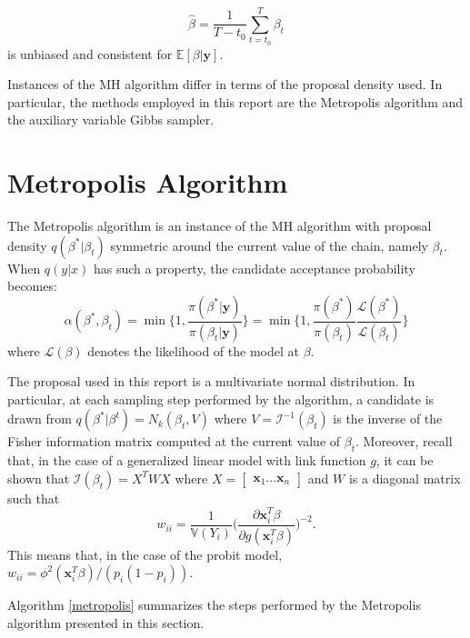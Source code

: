 \documentclass{article}
\newcommand{\EX}[0]{\mathbb{E}} %
\newcommand{\V}[0]{\mathbb{V}}
\renewcommand{\vec}[1]{\mathbf{#1}}
\begin{document}
\begin{equation*}
    \hat{\beta} = \frac{1}{T-t_0} \sum_{t=t_0}^T \beta_t
\end{equation*}
is unbiased and consistent for \(\EX[\beta|\vec{y}]\).
\par
Instances of the MH algorithm differ in terms of the proposal density used. In particular, the methods employed in this report are the Metropolis algorithm and the auxiliary variable Gibbs sampler.

\section{Metropolis Algorithm}
The Metropolis algorithm is an instance of the MH algorithm with proposal density \(q(\beta^*|\beta_t)\) symmetric around the current value of the chain, namely \(\beta_t\). When \(q(y|x)\) has such a property, the candidate acceptance probability becomes:
\begin{equation*}
    \alpha(\beta^*, \beta_t) = \min\Bigg\{1, \frac{\pi(\beta^*|\vec{y})}{\pi(\beta_t|\vec{y})}\Bigg\} = \min\Bigg\{1, \frac{\pi(\beta^*)}{\pi(\beta_t)}\frac{\mathcal{L}(\beta^*)}{\mathcal{L}(\beta_t)}\Bigg\}
\end{equation*}
where \(\mathcal{L}(\beta)\) denotes the likelihood of the model at \(\beta\).
\par
The proposal used in this report is a multivariate normal distribution. In particular, at each sampling step performed by the algorithm, a candidate is drawn from \(q(\beta^*|\beta^t) = N_k(\beta_t,V)\) where \(V = \mathcal{I}^{-1}(\beta_t)\) is the inverse of the Fisher information matrix computed at the current value of \(\beta_t\). Moreover, recall that, in the case of a generalized linear model with link function \(g\), it can be shown that \(\mathcal{I}(\beta_t) = X^T W X\) where \(X = \begin{bmatrix} \vec{x}_1 \hdots \vec{x}_n \end{bmatrix}\) and \(W\) is a diagonal matrix such that 
\begin{equation*}
    w_{ii} = \frac{1}{\V(Y_i)}\bigg(\frac{\partial \vec{x}_i^T \beta}{\partial g(\vec{x}_i^T \beta)}\bigg)^{-2}.
\end{equation*}
This means that, in the case of the probit model, \(w_{ii} = \phi^2(\vec{x}_i^T \beta)/(p_i(1 - p_i))\).
\par 
Algorithm \ref{metropolis} summarizes the steps performed by the Metropolis algorithm presented in this section.
\end{document}
